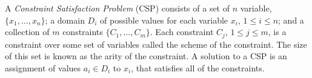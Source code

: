 \documentclass[../../thesis.tex]{subfiles}
\begin{document}
A \emph{Constraint Satisfaction Problem} (CSP) consists of a set of $n$ variable, 
$\{x_1, \dots, x_n \}$; a domain $D_i$ of possible values for each variable $x_i$, 
$1 \leq i \leq n$; and a collection of $m$ constraints $\{ C_1, \dots, C_m \}$. 
Each constraint $C_j$, $1 \leq j \leq m$, is a constraint over some set of variables called the scheme 
of the constraint. The size of this set is known as the arity of the constraint. 
A solution to a CSP is an assignment of values $a_i \in D_i$ to $x_i$, that satisfies all of the constraints. \cite{cp-definition}
\end{document}
